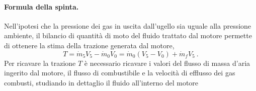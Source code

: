 \paragraph{Formula della spinta.}
Nell'ipotesi che la pressione dei gas in uscita dall'ugello sia uguale alla pressione ambiente, il bilancio di quantità di moto del fluido trattato dal motore permette di ottenere la stima della trazione generata dal motore,
\begin{equation}
 T = \dot{m}_5 V_5 - \dot{m}_0 V_0 = \dot{m}_0 ( V_5 - V_0 ) + \dot{m}_f V_5 \ .
\end{equation}
Per ricavare la trazione $T$ è necessario ricavare i valori del flusso di massa d'aria ingerito dal motore, il flusso di combustibile e la velocità di efflusso dei gas combusti, studiando in dettaglio il fluido all'interno del motore
% 
